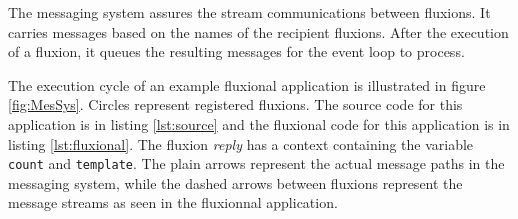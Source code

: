
The messaging system assures the stream communications between fluxions.
It carries messages based on the names of the recipient fluxions.
After the execution of a fluxion, it queues the resulting messages for the event loop to process.







The execution cycle of an example fluxional application is illustrated in figure \ref{fig:MesSys}.
Circles represent registered fluxions.
The source code for this application is in listing \ref{lst:source} and the fluxional code for this application is in listing \ref{lst:fluxional}.
The fluxion \textit{reply} has a context containing the variable \texttt{count} and \texttt{tem\-plate}.
The plain arrows represent the actual message paths in the messaging system, while the dashed arrows between fluxions represent the message streams as seen in the fluxionnal application.

